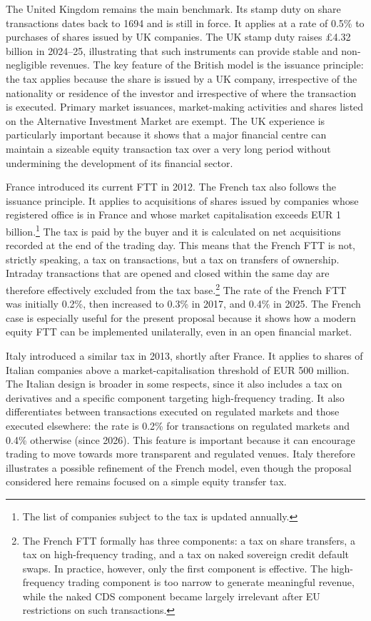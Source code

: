 \documentclass[../../main]{subfiles}
\begin{document}
The United Kingdom remains the main benchmark. Its stamp duty on share transactions dates back to 1694 and is still in force. It applies at a rate of 0.5\% to purchases of shares issued by UK companies. The UK stamp duty raises \pounds{}4.32 billion in 2024--25, illustrating that such instruments can provide stable and non-negligible revenues. The key feature of the British model is the issuance principle: the tax applies because the share is issued by a UK company, irrespective of the nationality or residence of the investor and irrespective of where the transaction is executed. Primary market issuances, market-making activities and shares listed on the Alternative Investment Market are exempt. The UK experience is particularly important because it shows that a major financial centre can maintain a sizeable equity transaction tax over a very long period without undermining the development of its financial sector.

France introduced its current FTT in 2012. The French tax also follows the issuance principle. It applies to acquisitions of shares issued by companies whose registered office is in France and whose market capitalisation exceeds EUR 1 billion.\footnote{The list of companies subject to the tax is updated annually.} The tax is paid by the buyer and it is calculated on net acquisitions recorded at the end of the trading day. This means that the French FTT is not, strictly speaking, a tax on transactions, but a tax on transfers of ownership. Intraday transactions that are opened and closed within the same day are therefore effectively excluded from the tax base.\footnote{The French FTT formally has three components: a tax on share transfers, a tax on high-frequency trading, and a tax on naked sovereign credit default swaps. In practice, however, only the first component is effective. The high-frequency trading component is too narrow to generate meaningful revenue, while the naked CDS component became largely irrelevant after EU restrictions on such transactions.} The rate of the French FTT was initially 0.2\%, then increased to 0.3\% in 2017, and 0.4\% in 2025. The French case is especially useful for the present proposal because it shows how a modern equity FTT can be implemented unilaterally, even in an open financial market.

Italy introduced a similar tax in 2013, shortly after France. It applies to shares of Italian companies above a market-capitalisation threshold of EUR 500 million. The Italian design is broader in some respects, since it also includes a tax on derivatives and a specific component targeting high-frequency trading. It also differentiates between transactions executed on regulated markets and those executed elsewhere: the rate is 0.2\% for transactions on regulated markets and 0.4\% otherwise (since 2026). This feature is important because it can encourage trading to move towards more transparent and regulated venues. Italy therefore illustrates a possible refinement of the French model, even though the proposal considered here remains focused on a simple equity transfer tax.
\end{document}
